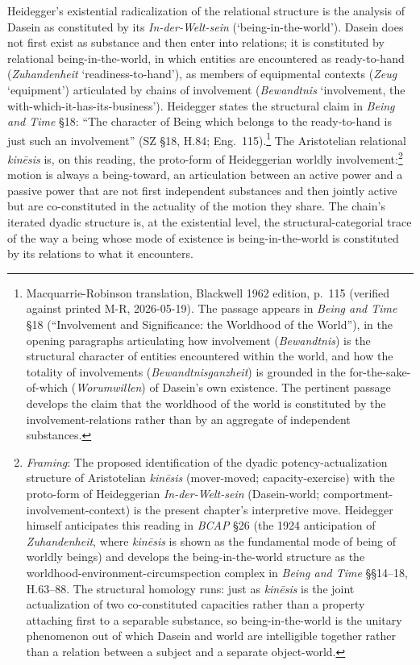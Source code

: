 Heidegger's existential radicalization of the relational structure is the analysis of Dasein as constituted by its \textit{In-der-Welt-sein} (`being-in-the-world'). Dasein does not first exist as substance and then enter into relations; it is constituted by relational being-in-the-world, in which entities are encountered as ready-to-hand (\textit{Zuhandenheit} `readiness-to-hand'), as members of equipmental contexts (\textit{Zeug} `equipment') articulated by chains of involvement (\textit{Bewandtnis} `involvement, the with-which-it-has-its-business'). Heidegger states the structural claim in \textit{Being and Time} \S 18: ``The character of Being which belongs to the ready-to-hand is just such an involvement'' (SZ \S 18, H.84; Eng.~115).\footnote{Macquarrie-Robinson translation, Blackwell 1962 edition, p.~115 (verified against printed M-R, 2026-05-19). The passage appears in \textit{Being and Time} \S 18 (``Involvement and Significance: the Worldhood of the World''), in the opening paragraphs articulating how involvement (\textit{Bewandtnis}) is the structural character of entities encountered within the world, and how the totality of involvements (\textit{Bewandtnisganzheit}) is grounded in the for-the-sake-of-which (\textit{Worumwillen}) of Dasein's own existence. The pertinent passage develops the claim that the worldhood of the world is constituted by the involvement-relations rather than by an aggregate of independent substances.} The Aristotelian relational \textit{kinēsis} is, on this reading, the proto-form of Heideggerian worldly involvement:\footnote{\textit{Framing}: The proposed identification of the dyadic potency-actualization structure of Aristotelian \textit{kin\=esis} (mover-moved; capacity-exercise) with the proto-form of Heideggerian \textit{In-der-Welt-sein} (Dasein-world; comportment-involvement-context) is the present chapter's interpretive move. Heidegger himself anticipates this reading in \textit{BCAP} §26 (the 1924 anticipation of \textit{Zuhandenheit}, where \textit{kin\=esis} is shown as the fundamental mode of being of worldly beings) and develops the being-in-the-world structure as the worldhood-environment-circumspection complex in \textit{Being and Time} §§14--18, H.63--88. The structural homology runs: just as \textit{kin\=esis} is the joint actualization of two co-constituted capacities rather than a property attaching first to a separable substance, so being-in-the-world is the unitary phenomenon out of which Dasein and world are intelligible together rather than a relation between a subject and a separate object-world.} motion is always a being-toward, an articulation between an active power and a passive power that are not first independent substances and then jointly active but are co-constituted in the actuality of the motion they share. The chain's iterated dyadic structure is, at the existential level, the structural-categorial trace of the way a being whose mode of existence is being-in-the-world is constituted by its relations to what it encounters.


